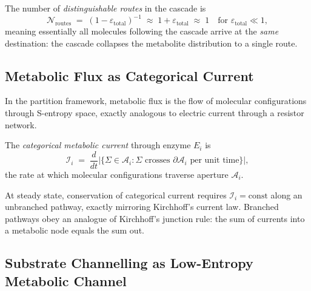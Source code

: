 \begin{corollary}
\label{cor:ch03-routing-precision}
The number of \emph{distinguishable routes} in the cascade is
\begin{equation}
    \mathcal{N}_{\mathrm{routes}}
    \;=\;
    (1-\varepsilon_{\mathrm{total}})^{-1}
    \;\approx\;
    1 + \varepsilon_{\mathrm{total}}
    \;\approx\; 1
    \quad\text{for }\varepsilon_{\mathrm{total}}\ll 1,
    \label{eq:ch03-routes}
\end{equation}
meaning essentially all molecules following the cascade arrive at the
\emph{same} destination: the cascade collapses the metabolite distribution
to a single route.
\end{corollary}

\subsection{Metabolic Flux as Categorical Current}

In the partition framework, metabolic flux is the flow of molecular
configurations through S-entropy space, exactly analogous to electric
current through a resistor network.

\begin{definition}
\label{def:ch03-cat-current}
The \emph{categorical metabolic current} through enzyme $E_i$ is
\begin{equation}
    \mathcal{I}_i
    \;=\;
    \frac{d}{dt}
    \bigl|\{\Sigma\in\mathcal{A}_i : \Sigma \text{ crosses }\partial\mathcal{A}_i
    \text{ per unit time}\}\bigr|,
    \label{eq:ch03-cat-current}
\end{equation}
the rate at which molecular configurations traverse aperture $\mathcal{A}_i$.
\end{definition}

At steady state, conservation of categorical current requires
$\mathcal{I}_i=\mathrm{const}$ along an unbranched pathway, exactly
mirroring Kirchhoff's current law.  Branched pathways obey an analogue
of Kirchhoff's junction rule: the sum of currents into a metabolic node
equals the sum out.

\subsection{Substrate Channelling as Low-Entropy Metabolic Channel}

